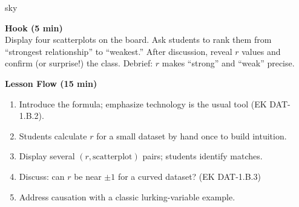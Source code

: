 \documentclass[10pt]{article}
\begin{document}
\begin{skillbox}{sky}
\begin{minipage}[t]{0.48\linewidth}
    \textbf{Hook (5 min)}\\
    Display four scatterplots on the board. Ask students to rank them from ``strongest
    relationship'' to ``weakest.'' After discussion, reveal $r$ values and confirm (or
    surprise!) the class. Debrief: $r$ makes ``strong'' and ``weak'' precise.
\end{minipage}
\hfill
\begin{minipage}[t]{0.48\linewidth}
    \textbf{Lesson Flow (15 min)}
    \begin{enumerate}
        \item Introduce the formula; emphasize technology is the usual tool (EK DAT-1.B.2).
        \item Students calculate $r$ for a small dataset by hand once to build intuition.
        \item Display several $(r, \text{scatterplot})$ pairs; students identify matches.
        \item Discuss: can $r$ be near $\pm 1$ for a curved dataset? (EK DAT-1.B.3)
        \item Address causation with a classic lurking-variable example.
    \end{enumerate}
\end{minipage}
\end{skillbox}
\end{document}
